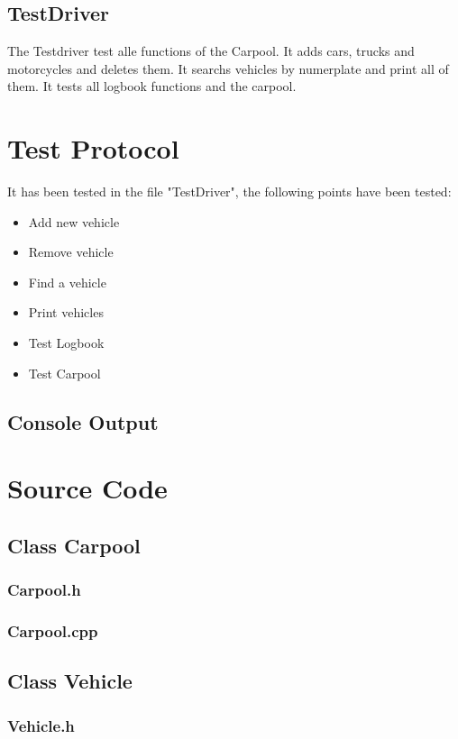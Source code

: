\subsection{TestDriver}
The Testdriver test alle functions of the Carpool. It adds cars, trucks and motorcycles and deletes them.
It searchs vehicles by numerplate and print all of them. It tests all logbook functions and the carpool.

\section{Test Protocol}
It has been tested in the file "TestDriver", the following points have been tested:
\begin{itemize}
	\item Add new vehicle
	\item Remove vehicle
	\item Find a vehicle
	\item Print vehicles
	\item Test Logbook
	\item Test Carpool
\end{itemize}

\subsection{Console Output}

\section{Source Code}

\subsection{Class Carpool}
\subsubsection{Carpool.h}
\subsubsection{Carpool.cpp}

\subsection{Class Vehicle}
\subsubsection{Vehicle.h}
